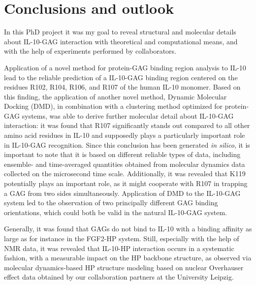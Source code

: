 \chapter{Conclusions and outlook}

In this PhD project it was my goal to reveal structural and molecular details
about IL-10-GAG interaction with theoretical and computational means, and with
the help of experiments performed by collaborators.

Application of a novel method for protein-GAG binding region analysis to IL-10
lead to the reliable prediction of a IL-10-GAG binding region centered on the
residues R102, R104, R106, and R107 of the human IL-10 monomer. Based on this
finding, the application of another novel method, Dynamic Molecular Docking
(DMD), in combination with a clustering method optimized for protein-GAG
systems, was able to derive further molecular detail about IL-10-GAG
interaction: it was found that R107 significantly stands out compared to all
other amino acid residues in IL-10 and supposedly plays a particularly important
role in IL-10-GAG recognition. Since this conclusion has been generated
\textit{in silico}, it is important to note that it is based on different
reliable types of data, including ensemble- and time-averaged quantities
obtained from molecular dynamics data collected on the microsecond time scale.
Additionally, it was revealed that K119 potentially plays an important role, as
it might cooperate with R107 in trapping a GAG from two sides simultaneously.
Application of DMD to the IL-10-GAG system led to the observation of two
principally different GAG binding orientations, which could both be valid in the
natural IL-10-GAG system.

Generally, it was found that GAGs do not bind to IL-10 with a binding affinity
as large as for instance in the FGF2-HP system. Still, especially with the help
of NMR data, it was revealed that IL-10-HP interaction occurs in a systematic
fashion, with a measurable impact on the HP backbone structure, as observed via
molecular dynamics-based HP structure modeling based on nuclear Overhauser
effect data obtained by our collaboration partners at the University Leipzig.


